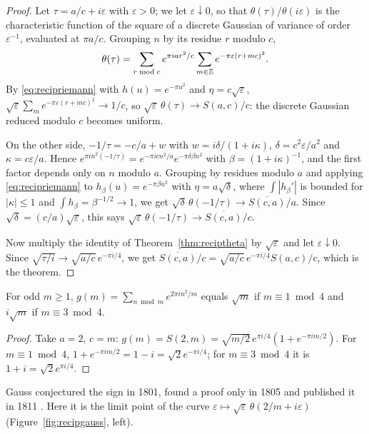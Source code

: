 \begin{proof}
Let $\tau=a/c+i\varepsilon$ with $\varepsilon>0$; we let $\varepsilon\downarrow0$, so that $\theta(\tau)/\theta(i\varepsilon)$ is the characteristic function of the square of a discrete Gaussian of variance of order $\varepsilon^{-1}$, evaluated at $\pi a/c$. Grouping $n$ by its residue $r$ modulo $c$,
\[
\theta(\tau)=\sum_{r\bmod c}e^{\pi iar^2/c}\sum_{m\in\mathbb{Z}}e^{-\pi\varepsilon(r+mc)^2}.
\]
By \eqref{eq:recipriemann} with $h(u)=e^{-\pi u^2}$ and $\eta=c\sqrt\varepsilon$, $\sqrt\varepsilon\sum_me^{-\pi\varepsilon(r+mc)^2}\to1/c$, so $\sqrt\varepsilon\,\theta(\tau)\to S(a,c)/c$: the discrete Gaussian reduced modulo $c$ becomes uniform.

On the other side, $-1/\tau=-c/a+w$ with $w=i\delta/(1+i\kappa)$, $\delta=c^2\varepsilon/a^2$ and $\kappa=c\varepsilon/a$. Hence $e^{\pi in^2(-1/\tau)}=e^{-\pi icn^2/a}e^{-\pi\delta\beta n^2}$ with $\beta=(1+i\kappa)^{-1}$, and the first factor depends only on $n$ modulo $a$. Grouping by residues modulo $a$ and applying \eqref{eq:recipriemann} to $h_\beta(u)=e^{-\pi\beta u^2}$ with $\eta=a\sqrt\delta$, where $\int|h_\beta'|$ is bounded for $|\kappa|\le1$ and $\int h_\beta=\beta^{-1/2}\to1$, we get $\sqrt\delta\,\theta(-1/\tau)\to\overline{S(c,a)}/a$. Since $\sqrt\delta=(c/a)\sqrt\varepsilon$, this says $\sqrt\varepsilon\,\theta(-1/\tau)\to\overline{S(c,a)}/c$.

Now multiply the identity of Theorem~\ref{thm:reciptheta} by $\sqrt\varepsilon$ and let $\varepsilon\downarrow0$. Since $\sqrt{\tau/i}\to\sqrt{a/c}\,e^{-\pi i/4}$, we get $\overline{S(c,a)}/c=\sqrt{a/c}\,e^{-\pi i/4}S(a,c)/c$, which is the theorem.
\end{proof}

\begin{corollary}\label{cor:recipgausssign}
For odd $m\ge1$, $g(m)=\sum_{n\bmod m}e^{2\pi in^2/m}$ equals $\sqrt m$ if $m\equiv1\bmod4$ and $i\sqrt m$ if $m\equiv3\bmod4$.
\end{corollary}

\begin{proof}
Take $a=2$, $c=m$: $g(m)=S(2,m)=\sqrt{m/2}\,e^{\pi i/4}(1+e^{-\pi im/2})$. For $m\equiv1\bmod4$, $1+e^{-\pi im/2}=1-i=\sqrt2e^{-\pi i/4}$; for $m\equiv3\bmod4$ it is $1+i=\sqrt2e^{\pi i/4}$.
\end{proof}

Gauss conjectured the sign in 1801, found a proof only in 1805 and published it in 1811 \cite{gauss1811}. Here it is the limit point of the curve $\varepsilon\mapsto\sqrt\varepsilon\,\theta(2/m+i\varepsilon)$ (Figure~\ref{fig:recipgauss}, left).

